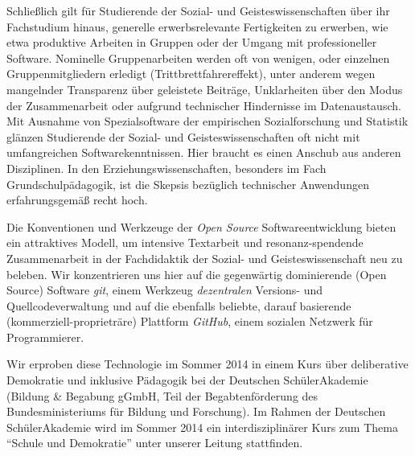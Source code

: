 \documentclass[11pt,a4paper,oneside]{article}
\begin{document}
Schließlich gilt für Studierende der Sozial- und Geisteswissenschaften über ihr Fachstudium hinaus, generelle erwerbsrelevante Fertigkeiten zu erwerben, wie etwa produktive Arbeiten in Gruppen oder der Umgang mit professioneller Software.
Nominelle Gruppenarbeiten werden oft von wenigen, oder einzelnen Gruppenmitgliedern erledigt (Trittbrettfahrereffekt), unter anderem wegen mangelnder Transparenz über geleistete Beiträge, Unklarheiten über den Modus der Zusammenarbeit oder aufgrund technischer Hindernisse im Datenaustausch.
Mit Ausnahme von Spezialsoftware der empirischen Sozialforschung und Statistik glänzen Studierende der Sozial- und Geisteswissenschaften oft nicht mit umfangreichen Softwarekenntnissen.
Hier braucht es einen Anschub aus anderen Disziplinen.
In den Erziehungswissenschaften, besonders im Fach Grundschulpädagogik, ist die Skepsis bezüglich technischer Anwendungen erfahrungsgemäß recht hoch.

Die Konventionen und Werkzeuge der \emph{Open Source} Softwareentwicklung bieten ein attraktives Modell, um intensive Textarbeit und resonanz-spendende  Zusammenarbeit in der Fachdidaktik der Sozial- und Geisteswissenschaft neu zu beleben.
Wir konzentrieren uns hier auf die gegenwärtig dominierende  (Open Source) Software \emph{git}, einem Werkzeug \emph{dezentralen} Versions- und Quellcodeverwaltung und auf die ebenfalls beliebte, darauf basierende (kommerziell-proprieträre) Plattform \emph{GitHub}, einem sozialen Netzwerk für Programmierer.

Wir erproben diese Technologie im Sommer 2014 in einem Kurs über deliberative Demokratie und inklusive Pädagogik bei der Deutschen SchülerAkademie (Bildung \& Begabung gGmbH, Teil der Begabtenförderung des Bundesministeriums für Bildung und Forschung).
Im Rahmen der Deutschen SchülerAkademie wird im Sommer 2014 ein interdisziplinärer Kurs zum Thema ``Schule und Demokratie'' unter unserer Leitung stattfinden.
\end{document}

